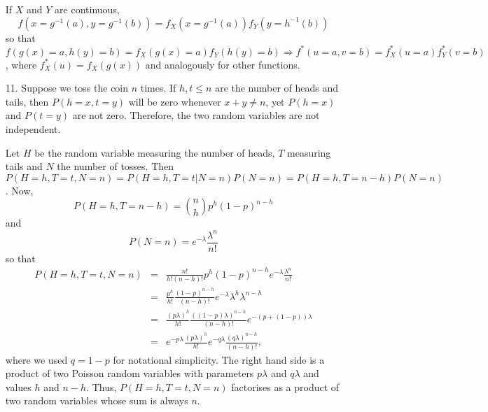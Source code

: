 \documentclass{article}
\begin{document}
\begin{enumerate}
If $X$ and $Y$ are continuous, 
\[
f(x=g^{-1}(a), y=g^{-1}(b)) = f_X(x=g^{-1}(a))f_Y(y=h^{-1}(b)) 
\]
so that $f(g(x)=a, h(y)=b) = f_X(g(x)=a)f_Y(h(y)=b) 
\Rightarrow f^\ast(u=a, v=b) = f_X^\ast(u=a)f_Y^\ast(v=b)$, where $f_X^\ast(u)
= f_X(g(x))$ and analogously for other functions.

\item[11.] Suppose we toss the coin $n$ times. If $h, t \le n$ are the number of 
heads and tails, then $P(h = x, t = y)$ will be zero whenever $x + y \ne n$, yet
$P(h = x)$ and $P(t = y)$ are not zero. Therefore, the two random variables are 
not independent.

Let $H$ be the random variable measuring the number of heads, $T$ measuring tails
and $N$ the number of tosses. Then $P(H = h, T = t, N = n) = P(H=h, T=t|N=n)
P(N=n) = P(H=h, T=n-h)P(N=n)$. Now,
\[
P(H=h, T=n-h) = \binom{n}{h}p^{h}(1 - p)^{n-h}
\]
and
\[
P(N=n) = e^{-\lambda}\frac{\lambda^n}{n!}
\]
so that
\begin{eqnarray*}
P(H = h, T = t, N = n) &=& 
	\frac{n!}{h!(n-h)!}p^h(1-p)^{n-h}e^{-\lambda}\frac{\lambda^n}{n!} \\
 &=& \frac{p^h}{h!}\frac{(1-p)^{n-h}}{(n-h)!} e^{-\lambda}\lambda^h \lambda^{n-h} \\
 &=& \frac{(p\lambda)^h}{h!}\frac{((1-p)\lambda)^{n-h}}{(n-h)!}e^{-(p + (1 - p))\lambda} \\
 &=& e^{-p\lambda}\frac{(p\lambda)^h}{h!} e^{-q\lambda}\frac{(q\lambda)^{n-h}}{(n-h)!},
\end{eqnarray*}
where we used $q = 1 - p$ for notational simplicity. The right hand side is a 
product of two Poisson random variables with parameters $p\lambda$ and $q\lambda$
and values $h$ and $n - h$. Thus, $P(H=h, T=t, N=n)$ factorises as a product of
two random variables whose sum is always $n$.
\end{enumerate}
\end{document}
